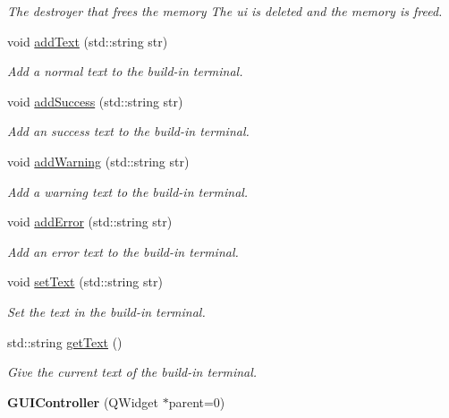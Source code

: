 \begin{DoxyCompactItemize}
\begin{DoxyCompactList}\small\item\em The destroyer that frees the memory The ui is deleted and the memory is freed. \end{DoxyCompactList}\item 
void \hyperlink{classGUIController_a3e67be4bfe8c3ebdf943540e1b06949b}{add\-Text} (std\-::string str)
\begin{DoxyCompactList}\small\item\em Add a normal text to the build-\/in terminal. \end{DoxyCompactList}\item 
void \hyperlink{classGUIController_ac57ebab895a0f83ca9c09fd60d835585}{add\-Success} (std\-::string str)
\begin{DoxyCompactList}\small\item\em Add an success text to the build-\/in terminal. \end{DoxyCompactList}\item 
void \hyperlink{classGUIController_a5ea3697ae0408cb521e82a0b315d2661}{add\-Warning} (std\-::string str)
\begin{DoxyCompactList}\small\item\em Add a warning text to the build-\/in terminal. \end{DoxyCompactList}\item 
void \hyperlink{classGUIController_a8b5677300791307f8597dc427772ad11}{add\-Error} (std\-::string str)
\begin{DoxyCompactList}\small\item\em Add an error text to the build-\/in terminal. \end{DoxyCompactList}\item 
void \hyperlink{classGUIController_aff7752195a9d8c86d326f212ccda1e7b}{set\-Text} (std\-::string str)
\begin{DoxyCompactList}\small\item\em Set the text in the build-\/in terminal. \end{DoxyCompactList}\item 
std\-::string \hyperlink{classGUIController_a494d1c2423ce3e7d44633edc50269803}{get\-Text} ()
\begin{DoxyCompactList}\small\item\em Give the current text of the build-\/in terminal. \end{DoxyCompactList}\item 
\hypertarget{classGUIController_a3f85fdeac642a3c52c0f0b586462eb8a}{{\bfseries G\-U\-I\-Controller} (Q\-Widget $\ast$parent=0)}\label{classGUIController_a3f85fdeac642a3c52c0f0b586462eb8a}

\end{DoxyCompactItemize}
